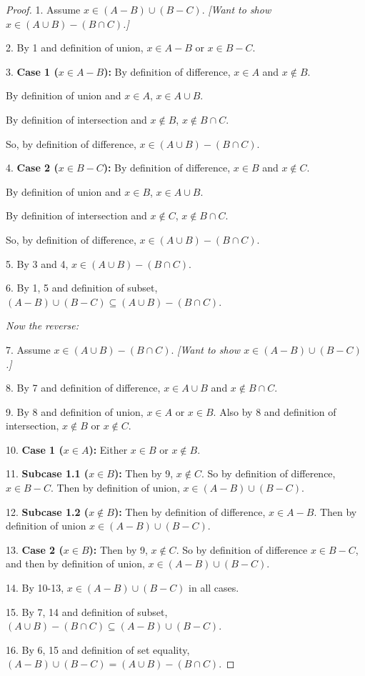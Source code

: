 \documentclass[14pt]{extarticle}
\begin{document}
\begin{proof}
1. Assume \(x \in (A - B) \cup (B - C)\). {\it [Want to show \(x \in (A \cup B) - (B \cap C)\).]}

2. By 1 and definition of union, \(x \in A - B\) or \(x \in B - C\).

3. {\bf Case 1 (\(x \in A - B\)):} By definition of difference, $x \in A$ and $x \notin B$. 

By definition of union and \(x \in A\), \(x \in A \cup B\).

By definition of intersection and \(x \notin B\), \(x \notin B \cap C\). 

So, by definition of difference, \(x \in (A \cup B) - (B \cap C)\).

4. {\bf Case 2 (\(x \in B - C\)):} By definition of difference, $x \in B$ and $x \notin C$. 

By definition of union and \(x \in B\), \(x \in A \cup B\). 

By definition of intersection and \(x \notin C\), \(x \notin B \cap C\). 

So, by definition of difference, \(x \in (A \cup B) - (B \cap C)\).

5. By 3 and 4, \(x \in (A \cup B) - (B \cap C)\).

6. By 1, 5 and definition of subset, \((A - B) \cup (B - C) \subseteq (A \cup B) - (B \cap C)\).

{\it Now the reverse:}

7. Assume \(x \in (A \cup B) - (B \cap C)\). {\it [Want to show \(x \in (A - B) \cup (B - C)\).]}

8. By 7 and definition of difference, \(x \in A \cup B\) and \(x \notin B \cap C\).

9. By 8 and definition of union, \(x \in A\) or \(x \in B\). Also by 8 and definition of intersection, 
\(x \notin B\) or \(x \notin C\). 

10. {\bf Case 1 (\(x \in A\)):} Either $x \in B$ or $x \notin B$.

11. {\bf Subcase 1.1 (\(x \in B\)):} Then by 9, \(x \notin C\). So by definition of difference, \(x \in B-C\). Then by
definition of union, \(x \in (A-B) \cup (B-C)\).

12. {\bf Subcase 1.2 (\(x \notin B\)):} Then by definition of difference, \(x \in A - B\). Then by definition of union
\(x \in (A-B) \cup (B-C)\).

13. {\bf Case 2 (\(x \in B\)):} Then by 9, \(x \notin C\). So by definition of difference \(x \in B-C\), and then by
definition of union, \(x \in (A-B) \cup (B-C)\).

14. By 10-13, \(x \in (A-B) \cup (B-C)\) in all cases.

15. By 7, 14 and definition of subset, \((A \cup B) - (B \cap C) \subseteq (A - B) \cup (B - C)\).

16. By 6, 15 and definition of set equality, \((A - B) \cup (B - C) = (A \cup B) - (B \cap C)\).
\end{proof}
\end{document}
